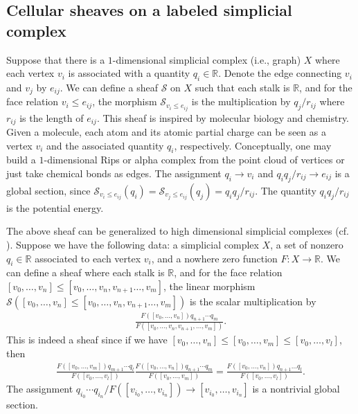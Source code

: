 \documentclass[11pt]{article}
\theoremstyle{definition}
\theoremstyle{definition}
\newcommand{\real}{\mathbb R}
\begin{document}
\subsection{Cellular sheaves on a labeled simplicial complex} \label{cellular sheaves on a labeled simplicial complex}

Suppose that there is a $1$-dimensional simplicial complex (i.e., graph) $X$ where
each vertex $v_i$ is associated with a quantity $q_i\in \real$.
Denote the edge connecting $v_i$ and $v_j$ by $e_{ij}$.
We can define a sheaf $\mathscr{S}$ on $X$ such that each stalk is $\mathbb R$, and
for the face relation $v_i \leqslant e_{ij}$, 
the morphism $\mathscr{S}_{v_i \leqslant e_{ij}}$ is the multiplication by $q_j/r_{ij}$ 
where $r_{ij}$ is the length of $e_{ij}$.
This sheaf is inspired by molecular biology and chemistry. Given a molecule, each atom and its atomic partial charge can be seen as a vertex $v_i$ and 
the associated quantity $q_i$, respectively. Conceptually, one may build a $1$-dimensional Rips or alpha complex from the point cloud of vertices or just take chemical bonds as edges.  
The assignment $q_i \to v_i$ and $q_iq_j/r_{ij} \to e_{ij}$ is a global section, 
since $\mathscr{S}_{v_i \leqslant e_{ij}}(q_i) = \mathscr{S}_{v_j \leqslant e_{ij}}(q_j) = q_iq_j/r_{ij}$. 
The quantity $q_iq_j/r_{ij}$ is the potential energy. 

The above sheaf can be generalized to high dimensional simplicial complexes (cf. \cite{wu2018weighted}).
Suppose we have the following data: a simplicial complex $X$, a set of nonzero $q_i \in \mathbb{R}$ 
associated to each vertex $v_i$, and a nowhere zero function $F: X \to \mathbb{R}$. 
We can define a sheaf where each stalk is $\mathbb{R}$, and
for the face relation $[v_0, \dots, v_n] \leqslant [v_0, \dots, v_n, v_{n+1} \dots, v_m]$,
the linear morphism $\mathscr{S}([v_0, \dots, v_n] \leqslant [v_0, \dots, v_n, v_{n+1} \dots, v_m])$ is 
the scalar multiplication by
\begin{align*}
     \frac{F([v_0, \dots, v_n])q_{n+1}\cdots q_{m}}{F([v_0, \dots, v_n, v_{n+1}, \dots, v_m])}.
\end{align*}
This is indeed a sheaf since if we have $[v_0, \dots, v_n] \leqslant [v_0, \dots, v_m] \leqslant [v_0, \dots, v_l]$, then 
\begin{align*}
    \frac{F([v_0, \dots, v_m])q_{m+1}\cdots q_l}{F([v_0, \dots, v_l])} \frac{F([v_0, \dots, v_n])q_{n+1}\cdots q_{m}}{F([v_0, \dots, v_m])} = \frac{F([v_0, \dots, v_n])q_{n+1}\dots q_l}{F([v_0, \dots, v_l])}.
\end{align*}
The assignment $q_{i_0}\cdots q_{i_n}/F([v_{i_0}, \dots, v_{i_n}]) \to [v_{i_0}, \dots, v_{i_n}]$ is a nontrivial global section.
\end{document}

